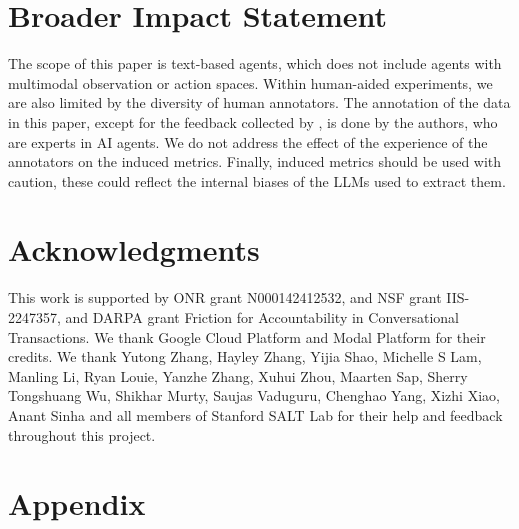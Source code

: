 \documentclass{article} %
\begin{document}
	\section*{Broader Impact Statement}
	The scope of this paper is text-based agents, which does not include agents
	with multimodal observation or action spaces. Within human-aided experiments,
	we are also limited by the diversity of human annotators. The annotation of the
	data in this paper, except for the feedback collected by \citet{shao2024collaborative},
	is done by the authors, who are experts in AI agents. We do not address the
	effect of the experience of the annotators on the induced metrics. Finally,
	induced metrics should be used with caution, these could reflect the internal biases
	of the LLMs used to extract them.


	\section*{Acknowledgments}
	This work is supported by ONR grant N000142412532, and NSF grant IIS-2247357, and DARPA grant Friction for Accountability in Conversational Transactions.
	We thank Google Cloud Platform and Modal Platform for their credits. We thank Yutong
	Zhang, Hayley Zhang, Yijia Shao, Michelle S Lam, Manling Li, Ryan Louie, Yanzhe
	Zhang, Xuhui Zhou, Maarten Sap, Sherry Tongshuang Wu, Shikhar Murty, Saujas
	Vaduguru, Chenghao Yang, Xizhi Xiao, Anant Sinha and all members of Stanford SALT
	Lab for their help and feedback throughout this project.

	



	\newpage
	\appendix
	\section*{Appendix}
	
\end{document}
